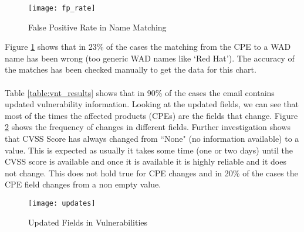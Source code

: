 \begin{figure}[h!]
  \centering
    \texttt{[image: fp\_rate]}
  \caption{False Positive Rate in Name Matching}
  \label{figure:fp_rate}

\end{figure}


Figure \ref{figure:fp_rate} shows that in 23\% of the cases the matching from the CPE to a WAD name has been wrong (too generic WAD names like `Red Hat'). The accuracy of the matches has been checked manually to get the data for this chart.
\paragraph{}
Table \ref{table:vnt_results} shows that in 90\%  of the cases the email contains updated vulnerability information. Looking at the updated fields, we can see that most of the times the affected products (CPEs) are the fields that change. Figure \ref{figure:updates} shows the frequency of changes in different fields. Further investigation shows that CVSS Score has always changed from ``None" (no information available) to a value. This is expected as usually it takes some time (one or two days) until the CVSS score is available and once it is available it is highly reliable and it does not change. This does not hold true for CPE changes and in 20\% of the cases the CPE field changes from a non empty value.




\begin{figure}[h!]
  \centering
    \texttt{[image: updates]}
  \caption{Updated Fields in Vulnerabilities}
  \label{figure:updates}

\end{figure}
















